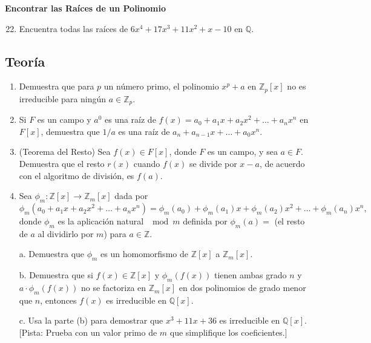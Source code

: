 \textbf{Encontrar las Raíces de un Polinomio}
	
\begin{enumerate}
	\setcounter{enumi}{21}
	\item Encuentra todas las raíces de \(6x^4 + 17x^3 + 11x^2 + x - 10\) en \(\mathbb{Q}\).
\end{enumerate}

\subsection*{Teoría}

\begin{enumerate}
	\item Demuestra que para \(p\) un número primo, el polinomio \(x^p + a\) en \(\mathbb{Z}_p[x]\) no es irreducible para ningún \(a \in \mathbb{Z}_p\).
	
	\item Si \(F\) es un campo y \(a^0\) es una raíz de \(f(x) = a_0 + a_1x + a_2x^2 + \ldots + a_nx^n\) en \(F[x]\), demuestra que \(1/a\) es una raíz de \(a_n + a_{n-1}x + \ldots + a_0x^n\).
	
	\item (Teorema del Resto) Sea \(f(x) \in F[x]\), donde \(F\) es un campo, y sea \(a \in F\). Demuestra que el resto \(r(x)\) cuando \(f(x)\) se divide por \(x - a\), de acuerdo con el algoritmo de división, es \(f(a)\).
	
	\item Sea \(\phi_m: \mathbb{Z}[x] \rightarrow \mathbb{Z}_m[x]\) dada por
	\[
	\phi_m(a_0 + a_1x + a_2x^2 + \ldots + a_nx^n) = \phi_m(a_0) + \phi_m(a_1)x + \phi_m(a_2)x^2 + \ldots + \phi_m(a_n)x^n,
	\]
	donde \(\phi_m\) es la aplicación natural \(\mod m\) definida por \(\phi_m(a) =\) (el resto de \(a\) al dividirlo por \(m\)) para \(a \in \mathbb{Z}\).
	
	a. Demuestra que \(\phi_m\) es un homomorfismo de \(\mathbb{Z}[x]\) a \(\mathbb{Z}_m[x]\).
	
	b. Demuestra que si \(f(x) \in \mathbb{Z}[x]\) y \(\phi_m(f(x))\) tienen ambas grado \(n\) y \(a \cdot \phi_m(f(x))\) no se factoriza en \(\mathbb{Z}_m[x]\) en dos polinomios de grado menor que \(n\), entonces \(f(x)\) es irreducible en \(\mathbb{Q}[x]\).
	
	c. Usa la parte (b) para demostrar que \(x^3 + 11x + 36\) es irreducible en \(\mathbb{Q}[x]\). [Pista: Prueba con un valor primo de \(m\) que simplifique los coeficientes.]
\end{enumerate}


